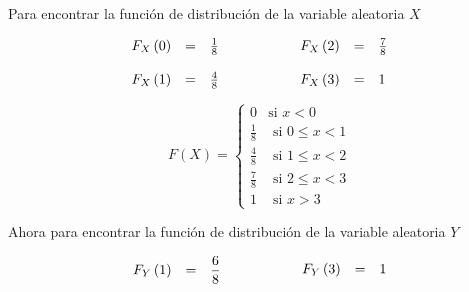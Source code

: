 \documentclass[12pt]{article}
\begin{document}
    \begin{flushleft}
        Para encontrar la funci\'on de distribuci\'on de la variable aleatoria $X$
    \end{flushleft}
        
    
    \begin{equation*}
        \begin{array}{cp{1cm}c}
            
        
            \begin{array}{rcl}
                F_X\left(0\right) & = & \frac{1}{8}
                \\
                \\
                F_X\left(1\right) & = & \frac{4}{8}               
            \end{array}
            &
            &
            \begin{array}{rcl}
                F_X\left(2\right) & = & \frac{7}{8}
                \\
                \\
                F_X\left(3\right) & = & 1
            \end{array}
        \end{array}
    \end{equation*}


    \begin{equation*}
        F\left(X\right) = \begin{cases}
            0 &\mbox{si   $x < 0 $}
            \\
            \frac{1}{8} & \mbox{   si   $0\le x < 1$}
            \\
            \frac{4}{8} & \mbox{   si   $1\le x < 2$}
            \\
            \frac{7}{8} & \mbox{   si   $2\le x < 3$}
            \\
            1 & \mbox{     si   $x>3$}
        \end{cases}
    \end{equation*}
     

    \begin{flushleft}
        Ahora para encontrar la funci\'on de distribuci\'on de la variable aleatoria $Y$
    \end{flushleft}


    \begin{equation*}
        \begin{array}{cp{1cm}c}    
            \begin{array}{ccc}
                F_{Y} \left(1\right)  & = & \displaystyle \frac{6}{8}
            \end{array}
            &
            &
            \begin{array}{ccc}  
                F_{Y} \left(3\right)  & = & 1
            \end{array}
    \end{array}
    \end{equation*}
        
\end{document}
